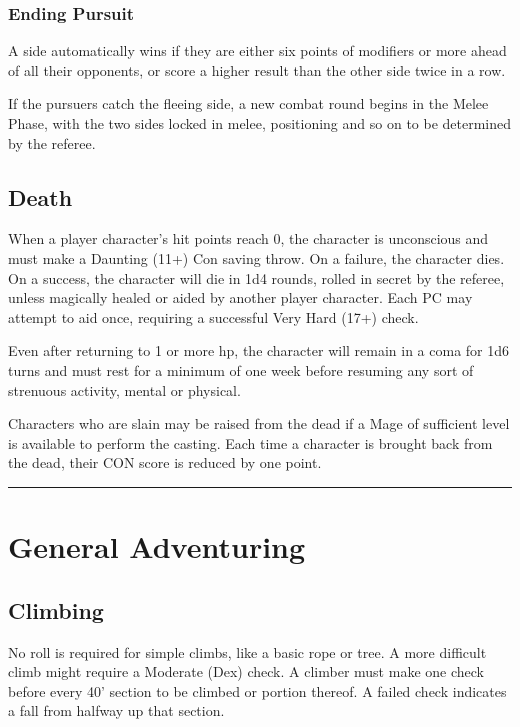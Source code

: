 \documentclass{article}
\begin{document}
\begin{multicols}{2}
\subsubsection{Ending Pursuit}\label{ending-pursuit}

A side automatically wins if they are either six points of modifiers or
more ahead of all their opponents, or score a higher result than the
other side twice in a row.

If the pursuers catch the fleeing side, a new combat round begins in the
Melee Phase, with the two sides locked in melee, positioning and so on
to be determined by the referee.

\subsection{Death}\label{death}

When a player character's hit points reach 0, the character is
unconscious and must make a Daunting (11+) Con saving throw. On a
failure, the character dies. On a success, the character will die in 1d4
rounds, rolled in secret by the referee, unless magically healed or
aided by another player character. Each PC may attempt to aid once,
requiring a successful Very Hard (17+) check.

Even after returning to 1 or more hp, the character will remain in a
coma for 1d6 turns and must rest for a minimum of one week before
resuming any sort of strenuous activity, mental or physical.

Characters who are slain may be raised from the dead if a Mage of
sufficient level is available to perform the casting. Each time a
character is brought back from the dead, their CON score is reduced by
one point.

\begin{center}\rule{0.5\linewidth}{0.5pt}\end{center}

\section{General Adventuring}\label{general-adventuring}

\subsection{Climbing}\label{climbing}

No roll is required for simple climbs, like a basic rope or tree. A more
difficult climb might require a Moderate (Dex) check. A climber must
make one check before every 40' section to be climbed or portion
thereof. A failed check indicates a fall from halfway up that section.


\end{multicols}
\end{document}
